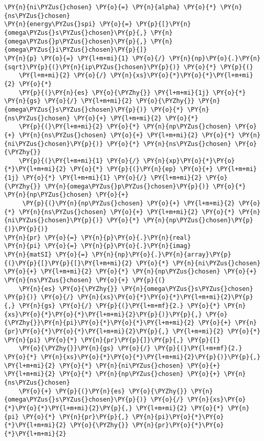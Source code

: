 \begin{Verbatim}[commandchars=\\\{\}]
\PY{n}{ni\PYZus{}chosen} \PY{o}{=} \PY{n}{alpha} \PY{o}{*} \PY{n}{ns\PYZus{}chosen}
\PY{n}{energy\PYZus{}spi} \PY{o}{=} \PY{p}{[}\PY{n}{omega\PYZus{}s\PYZus{}chosen}\PY{p}{,} \PY{n}{omega\PYZus{}p\PYZus{}chosen}\PY{p}{,} \PY{n}{omega\PYZus{}i\PYZus{}chosen}\PY{p}{]}
\PY{n}{p} \PY{o}{=} \PY{l+m+mi}{1} \PY{o}{/} \PY{n}{np}\PY{o}{.}\PY{n}{sqrt}\PY{p}{(}\PY{n}{ip\PYZus{}chosen}\PY{p}{)} \PY{o}{*} \PY{p}{(}
    \PY{l+m+mi}{2} \PY{o}{/} \PY{n}{xs}\PY{o}{*}\PY{o}{*}\PY{l+m+mi}{2} \PY{o}{*}
    \PY{p}{(}\PY{n}{es} \PY{o}{\PYZhy{}} \PY{l+m+mi}{1j} \PY{o}{*} \PY{n}{gs} \PY{o}{/} \PY{l+m+mi}{2} \PY{o}{\PYZhy{}} \PY{n}{omega\PYZus{}s\PYZus{}chosen}\PY{p}{)} \PY{o}{*} \PY{n}{ns\PYZus{}chosen} \PY{o}{+} \PY{l+m+mi}{2} \PY{o}{*}
    \PY{p}{(}\PY{l+m+mi}{2} \PY{o}{*} \PY{n}{np\PYZus{}chosen} \PY{o}{+} \PY{n}{ns\PYZus{}chosen} \PY{o}{+} \PY{l+m+mi}{2} \PY{o}{*} \PY{n}{ni\PYZus{}chosen}\PY{p}{)} \PY{o}{*} \PY{n}{ns\PYZus{}chosen} \PY{o}{\PYZhy{}}
    \PY{p}{(}\PY{l+m+mi}{1} \PY{o}{/} \PY{n}{xp}\PY{o}{*}\PY{o}{*}\PY{l+m+mi}{2} \PY{o}{*} \PY{p}{(}\PY{n}{ep} \PY{o}{+} \PY{l+m+mi}{1j} \PY{o}{*} \PY{l+m+mi}{1} \PY{o}{/} \PY{l+m+mi}{2} \PY{o}{\PYZhy{}} \PY{n}{omega\PYZus{}p\PYZus{}chosen}\PY{p}{)} \PY{o}{*} \PY{n}{np\PYZus{}chosen} \PY{o}{+}
     \PY{p}{(}\PY{n}{np\PYZus{}chosen} \PY{o}{+} \PY{l+m+mi}{2} \PY{o}{*} \PY{n}{ns\PYZus{}chosen} \PY{o}{+} \PY{l+m+mi}{2} \PY{o}{*} \PY{n}{ni\PYZus{}chosen}\PY{p}{)} \PY{o}{*} \PY{n}{np\PYZus{}chosen}\PY{p}{)}\PY{p}{)}
\PY{n}{pr} \PY{o}{=} \PY{n}{p}\PY{o}{.}\PY{n}{real}
\PY{n}{pi} \PY{o}{=} \PY{n}{p}\PY{o}{.}\PY{n}{imag}
\PY{n}{matSI} \PY{o}{=} \PY{n}{np}\PY{o}{.}\PY{n}{array}\PY{p}{(}\PY{p}{[}\PY{p}{[}\PY{l+m+mi}{2} \PY{o}{*} \PY{n}{ni\PYZus{}chosen} \PY{o}{+} \PY{l+m+mi}{2} \PY{o}{*} \PY{n}{np\PYZus{}chosen} \PY{o}{+} \PY{n}{ns\PYZus{}chosen} \PY{o}{+} \PY{p}{(}
    \PY{n}{es} \PY{o}{\PYZhy{}} \PY{n}{omega\PYZus{}s\PYZus{}chosen}
\PY{p}{)} \PY{o}{/} \PY{n}{xs}\PY{o}{*}\PY{o}{*}\PY{l+m+mi}{2}\PY{p}{,} \PY{n}{gs} \PY{o}{/} \PY{p}{(}\PY{l+m+mf}{2.} \PY{o}{*} \PY{n}{xs}\PY{o}{*}\PY{o}{*}\PY{l+m+mi}{2}\PY{p}{)}\PY{p}{,} \PY{o}{\PYZhy{}}\PY{n}{pi}\PY{o}{*}\PY{o}{*}\PY{l+m+mi}{2} \PY{o}{+} \PY{n}{pr}\PY{o}{*}\PY{o}{*}\PY{l+m+mi}{2}\PY{p}{,} \PY{l+m+mi}{2} \PY{o}{*} \PY{n}{pi} \PY{o}{*} \PY{n}{pr}\PY{p}{]}\PY{p}{,} \PY{p}{[}
    \PY{o}{\PYZhy{}}\PY{n}{gs} \PY{o}{/} \PY{p}{(}\PY{l+m+mf}{2.} \PY{o}{*} \PY{n}{xs}\PY{o}{*}\PY{o}{*}\PY{l+m+mi}{2}\PY{p}{)}\PY{p}{,} \PY{l+m+mi}{2} \PY{o}{*} \PY{n}{ni\PYZus{}chosen} \PY{o}{+} \PY{l+m+mi}{2} \PY{o}{*} \PY{n}{np\PYZus{}chosen} \PY{o}{+} \PY{n}{ns\PYZus{}chosen}
    \PY{o}{+} \PY{p}{(}\PY{n}{es} \PY{o}{\PYZhy{}} \PY{n}{omega\PYZus{}s\PYZus{}chosen}\PY{p}{)} \PY{o}{/} \PY{n}{xs}\PY{o}{*}\PY{o}{*}\PY{l+m+mi}{2}\PY{p}{,} \PY{l+m+mi}{2} \PY{o}{*} \PY{n}{pi} \PY{o}{*} \PY{n}{pr}\PY{p}{,} \PY{n}{pi}\PY{o}{*}\PY{o}{*}\PY{l+m+mi}{2} \PY{o}{\PYZhy{}} \PY{n}{pr}\PY{o}{*}\PY{o}{*}\PY{l+m+mi}{2}

\end{Verbatim}
